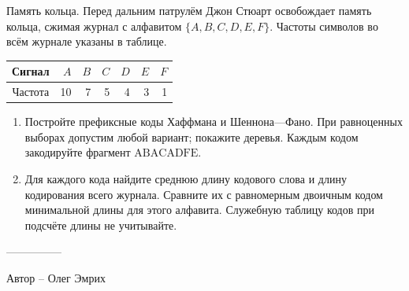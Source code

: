 \question
Память кольца. Перед дальним патрулём Джон Стюарт освобождает память кольца, сжимая журнал с алфавитом $\{A,B,C,D,E,F\}$. Частоты символов во всём журнале указаны в таблице.
\begin{center}\begin{tabular}{c|rrrrrr}Сигнал&$A$&$B$&$C$&$D$&$E$&$F$\\\hline Частота&10&7&5&4&3&1\end{tabular}\end{center}
\begin{enumerate}
\item Постройте префиксные коды Хаффмана и Шеннона---Фано. При равноценных выборах допустим любой вариант; покажите деревья. Каждым кодом закодируйте фрагмент $\mathrm{ABACADFE}$.
\item Для каждого кода найдите среднюю длину кодового слова и длину кодирования всего журнала. Сравните их с равномерным двоичным кодом минимальной длины для этого алфавита. Служебную таблицу кодов при подсчёте длины не учитывайте.
\end{enumerate}

---------------

Автор -- Олег Эмрих
